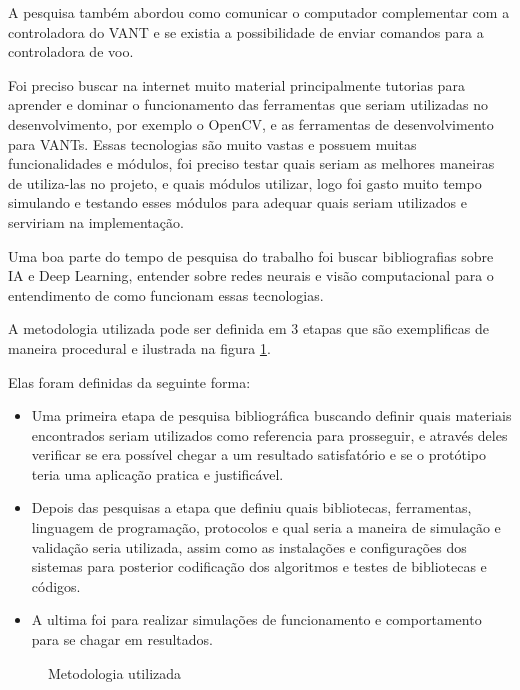A pesquisa também abordou como comunicar o computador complementar com a controladora do VANT e se existia a possibilidade de enviar comandos para a controladora de voo. 

Foi preciso buscar na internet muito material principalmente tutorias para aprender e dominar o funcionamento das ferramentas que seriam utilizadas no desenvolvimento, por exemplo o OpenCV, e as ferramentas de desenvolvimento para VANTs. Essas tecnologias são muito vastas e possuem muitas funcionalidades e módulos, foi preciso testar quais seriam as melhores maneiras de utiliza-las no projeto, e quais módulos utilizar, logo foi gasto muito tempo simulando e testando esses módulos para adequar quais seriam utilizados e serviriam na implementação.  

Uma boa parte do tempo de pesquisa  do trabalho foi buscar bibliografias sobre IA e Deep Learning, entender sobre redes neurais e visão computacional para o entendimento de como funcionam essas tecnologias.

A metodologia utilizada pode ser definida em 3 etapas que são exemplificas de maneira procedural e ilustrada na figura \ref{fig:diagmetpesq}.

Elas foram definidas da seguinte forma:

\begin{itemize}
	\item Uma primeira etapa de pesquisa bibliográfica buscando definir quais materiais encontrados seriam utilizados como referencia para prosseguir, e através deles verificar se era possível chegar a um resultado satisfatório e se o protótipo teria uma aplicação pratica e justificável. 
	
	\item Depois das pesquisas a etapa que definiu quais bibliotecas, ferramentas, linguagem de programação, protocolos e qual seria a maneira de simulação e validação seria utilizada, assim como as instalações e configurações dos sistemas para posterior codificação dos algoritmos e testes de bibliotecas e códigos.
	
	\item A ultima foi para realizar simulações de funcionamento e comportamento para se chagar em resultados.
\end{itemize}

\begin{figure}[H]
	\centering	
	\caption{Metodologia utilizada}
	\fontsize{9pt}{12pt}\selectfont
	\def\svgwidth{15cm}
	
	\label{fig:diagmetpesq}
\end{figure}

